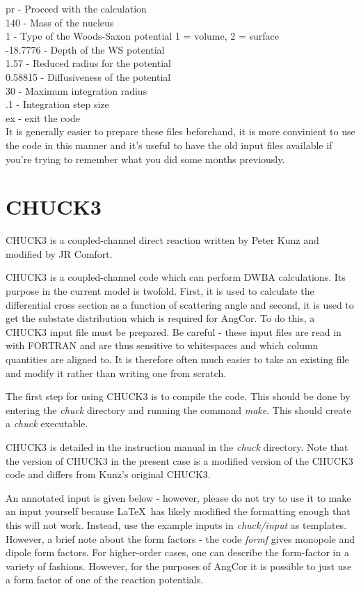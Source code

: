 \documentclass[a4paper,10pt]{article}
\begin{document}
\noindent pr - Proceed with the calculation\\
140 - Mass of the nucleus\\
1 - Type of the Woods-Saxon potential 1 = volume, 2 = surface\\
-18.7776 - Depth of the WS potential\\
1.57 - Reduced radius for the potential\\
0.58815 - Diffusiveness of the potential\\
30 - Maximum integration radius\\
.1 - Integration step size\\
ex - exit the code\\

It is generally easier to prepare these files beforehand, it is more convinient to use the code in this manner and it's useful to have the old input files available if you're trying to remember what you did some months previously.


\section{CHUCK3}

CHUCK3 is a coupled-channel direct reaction written by Peter Kunz and modified by JR Comfort.

CHUCK3 is a coupled-channel code which can perform DWBA calculations. Its purpose in the current model is twofold. First, it is used to calculate the differential cross section as a function of scattering angle and second, it is used to get the substate distribution which is required for AngCor. To do this, a CHUCK3 input file must be prepared. Be careful - these input files are read in with FORTRAN and are thus sensitive to whitespaces and which column quantities are aligned to. It is therefore often much easier to take an existing file and modify it rather than writing one from scratch.

The first step for using CHUCK3 is to compile the code. This should be done by entering the {\it chuck} directory and running the command {\it make}. This should create a {\it chuck} executable.

CHUCK3 is detailed in the instruction manual in the {\it chuck} directory. Note that the version of CHUCK3 in the present case is a modified version of the CHUCK3 code and differs from Kunz's original CHUCK3.

An annotated input is given below - however, please do not try to use it to make an input yourself because \LaTeX\ has likely modified the formatting enough that this will not work. Instead, use the example inputs in {\it chuck/input} as templates. However, a brief note about the form factors - the code {\it formf} gives monopole and dipole form factors. For higher-order cases, one can describe the form-factor in a variety of fashions. However, for the purposes of AngCor it is possible to just use a form factor of one of the reaction potentials.
\end{document}
